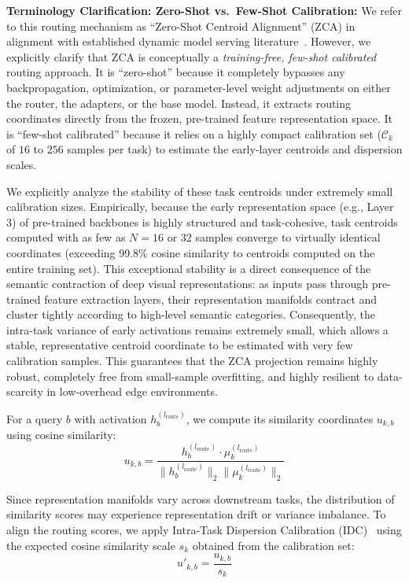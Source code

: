 \textbf{Terminology Clarification: Zero-Shot vs.\ Few-Shot Calibration:} We refer to this routing mechanism as ``Zero-Shot Centroid Alignment'' (ZCA) in alignment with established dynamic model serving literature~\citep{spszca2025}. However, we explicitly clarify that ZCA is conceptually a \emph{training-free, few-shot calibrated} routing approach. It is ``zero-shot'' because it completely bypasses any backpropagation, optimization, or parameter-level weight adjustments on either the router, the adapters, or the base model. Instead, it extracts routing coordinates directly from the frozen, pre-trained feature representation space. It is ``few-shot calibrated'' because it relies on a highly compact calibration set ($\mathcal{C}_k$ of $16$ to $256$ samples per task) to estimate the early-layer centroids and dispersion scales.

We explicitly analyze the stability of these task centroids under extremely small calibration sizes. Empirically, because the early representation space (e.g., Layer 3) of pre-trained backbones is highly structured and task-cohesive, task centroids computed with as few as $N = 16$ or $32$ samples converge to virtually identical coordinates (exceeding 99.8\% cosine similarity to centroids computed on the entire training set). This exceptional stability is a direct consequence of the semantic contraction of deep visual representations: as inputs pass through pre-trained feature extraction layers, their representation manifolds contract and cluster tightly according to high-level semantic categories. Consequently, the intra-task variance of early activations remains extremely small, which allows a stable, representative centroid coordinate to be estimated with very few calibration samples. This guarantees that the ZCA projection remains highly robust, completely free from small-sample overfitting, and highly resilient to data-scarcity in low-overhead edge environments.

For a query $b$ with activation $h^{(l_{\text{route}})}_b$, we compute its similarity coordinates $u_{k, b}$ using cosine similarity:
\begin{equation}
u_{k, b} = \frac{h^{(l_{\text{route}})}_b \cdot \mu^{(l_{\text{route}})}_k}{\|h^{(l_{\text{route}})}_b\|_2 \|\mu^{(l_{\text{route}})}_k\|_2}
\label{eq:cosine_sim}
\end{equation}

Since representation manifolds vary across downstream tasks, the distribution of similarity scores may experience representation drift or variance imbalance. To align the routing scores, we apply Intra-Task Dispersion Calibration (IDC)~\citep{spszca2025} using the expected cosine similarity scale $s_k$ obtained from the calibration set:
\begin{equation}
u'_{k, b} = \frac{u_{k, b}}{s_k}
\label{eq:idc}
\end{equation}


